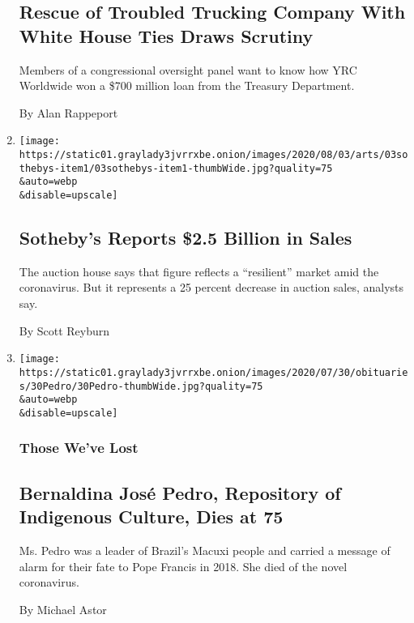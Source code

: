 \begin{enumerate}
{  \subsection{Rescue of Troubled Trucking Company With White House Ties
  Draws
  Scrutiny}\label{rescue-of-troubled-trucking-company-with-white-house-ties-draws-scrutiny}}

  Members of a congressional oversight panel want to know how YRC
  Worldwide won a \$700 million loan from the Treasury Department.

  By Alan Rappeport
\item
  \href{/2020/08/03/arts/design/sothebys-sales.html}{}

  \texttt{[image: https://static01.graylady3jvrrxbe.onion/images/2020/08/03/arts/03sothebys-item1/03sothebys-item1-thumbWide.jpg?quality=75\\\&auto=webp\\\&disable=upscale]}

  \hypertarget{sothebys-reports-25-billion-in-sales}{%
  \subsection{Sotheby's Reports \$2.5 Billion in
  Sales}\label{sothebys-reports-25-billion-in-sales}}

  The auction house says that figure reflects a ``resilient'' market
  amid the coronavirus. But it represents a 25 percent decrease in
  auction sales, analysts say.

  By Scott Reyburn
\item
  \href{/2020/08/03/obituaries/bernaldina-jose-pedro-dead-coronavirus.html}{}

  \texttt{[image: https://static01.graylady3jvrrxbe.onion/images/2020/07/30/obituaries/30Pedro/30Pedro-thumbWide.jpg?quality=75\\\&auto=webp\\\&disable=upscale]}

  \hypertarget{those-weve-lost}{%
  \subsubsection{Those We've Lost}\label{those-weve-lost}}

  \hypertarget{bernaldina-josuxe9-pedro-repository-of-indigenous-culture-dies-at-75}{%
  \subsection{Bernaldina José Pedro, Repository of Indigenous Culture,
  Dies at
  75}\label{bernaldina-josuxe9-pedro-repository-of-indigenous-culture-dies-at-75}}

  Ms. Pedro was a leader of Brazil's Macuxi people and carried a message
  of alarm for their fate to Pope Francis in 2018. She died of the novel
  coronavirus.

  By Michael Astor
\end{enumerate}

